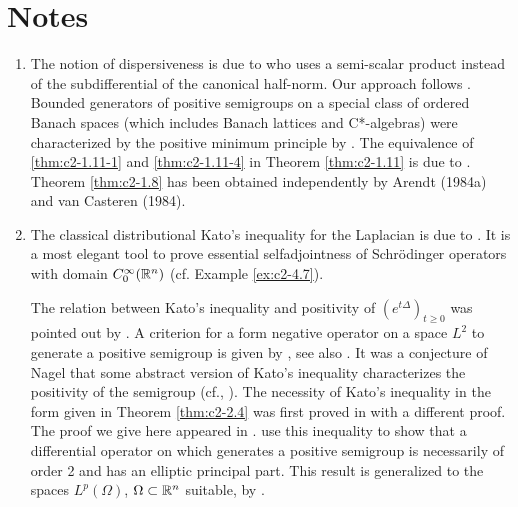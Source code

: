 \section*{Notes}

\begin{enumerate}[label=\emph{Section \arabic*:}, wide]

\item   The notion of dispersiveness is due to \citet{phillips:1962} who uses a semi-scalar product instead of the subdifferential of the canonical half-norm.
Our approach follows \citet{arendtchernoffkato:1982}.
Bounded generators of positive semigroups on a special class of ordered Banach spaces (which includes Banach lattices and C*-algebras) were characterized by the positive minimum principle by \citet{evanshancheolsen:1979}.
The equivalence of \ref{thm:c2-1.11-1} and \ref{thm:c2-1.11-4}  in Theorem \ref{thm:c2-1.11}  is due to \citet{nageluhlig:1981}.
Theorem \ref{thm:c2-1.8}   has been obtained independently by Arendt (1984a) and van Casteren (1984).

\smallskip
\item  
The classical distributional Kato's inequality for the Laplacian is due to \citet{kato:1973}.
It is a most elegant tool to prove essential selfadjointness of Schrödinger operators with domain $C^{\infty}_0(\mathbb{R}^n)$ (cf. Example \ref{ex:c2-4.7}).

The relation between Kato's inequality and positivity of $(e^{t\Delta})_{t \geq 0}$ was pointed out by \citet{simon:1977}.
A criterion for a form negative operator on a space $L^2$ to generate a positive semigroup is given by \citet{beurlingdeny:1958}, see also \citet[Vol. IV, Section XIII.12]{reedsimon:1978}.
It was a conjecture of Nagel that some abstract version of
Kato's inequality characterizes the positivity of the semigroup (cf., \citet{nageluhlig:1981}). The necessity of Kato's inequality in the form given in Theorem \ref{thm:c2-2.4}   was first proved in \citet[Remark 3.10]{arendt:1982} with a different proof. 
The proof we give here appeared in \citet{arendt:1984}. 
\citet{miyajimaokazawa:1984} use this inequality to show that a differential operator on which generates a positive semigroup is necessarily of order 2 and has an elliptic principal part. 
This result is generalized to the spaces $L^p(\Omega)$, $\Omega \subset \mathbb{R}^n$ suitable, by \citet{miyajima:1986}.


\end{enumerate}
